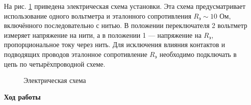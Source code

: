 \documentclass[a4paper, 12pt]{article}
\begin{document}
    На рис. \ref{pic3} приведена электрическая схема установки. Эта схема предусматривает использование одного вольтметра и эталонного сопротивления $ R_{э} \sim 10 \text{ Ом} $, включённого последовательно с нитью. В положении переключателя 2 вольтметр измеряет напряжение на нити, а в положении 1 — напряжение на $ R_{э} $, пропорциональное току через нить. Для исключения влияния контактов и подводящих проводов эталонное сопротивление $ R_{э} $ необходимо подключать в цепь по четырёхпроводной схеме.
    
    \begin{figure}[h]
        \caption{Электрическая схема}
        \label{pic3}
    \end{figure}
    
    \newpage
    
    \begin{center}
        {\Large {\bf Ход работы}}
    \end{center}
    
\end{document}

